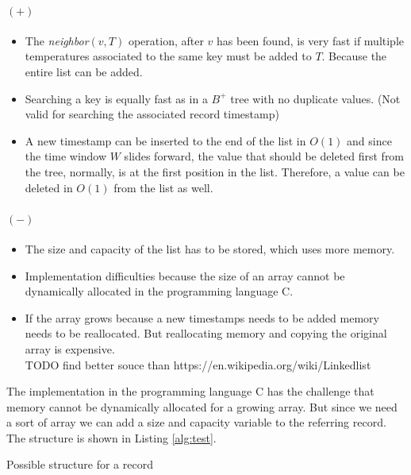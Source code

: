 \documentclass[abstracton,12pt]{scrreprt}
\begin{document}
\paragraph{$(+)$}
\begin{itemize}  
	\item  The \emph{neighbor}$(v,T)$ operation, after $v$ has been found, is very fast if multiple temperatures associated to the same key must be added to $T$. Because the entire list can be added. 
	\item Searching a key is equally fast as in a $B^+$ tree with no duplicate values. (Not valid for searching  the associated record timestamp)
	\item A new timestamp can be inserted to the end of the list in $O(1)$ and since the time window $W$ slides forward, the value that should be deleted first from the tree, normally, is at the first position in the list. Therefore, a value can be deleted in $O(1)$ from the list as well. 
\end{itemize}
\paragraph{$(-)$}
\begin{itemize}  
	\item The size and capacity of the list has to be stored, which uses more memory. 
	\item Implementation difficulties because the size of an array cannot be dynamically allocated in the programming language C.
	\item If the array grows because a new timestamps needs to be added memory needs to be reallocated. But reallocating memory and copying the original array is expensive. \\
	TODO find better souce than https://en.wikipedia.org/wiki/Linkedlist\\
\end{itemize}
The implementation in the programming language C has the challenge that memory cannot be dynamically allocated for a growing array. But since we need a sort of array we can add a size and capacity variable to the referring record. The structure is shown in Listing \ref{alg:test}.
\begin{algorithm}[H]

\caption{Possible structure for a record}
\end{algorithm}
\end{document}
